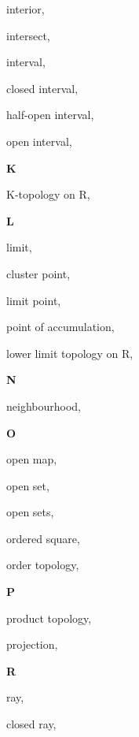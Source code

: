 \begin{multicols}{2}
interior, \pageref{def:Interior}

intersect, \pageref{def:Intersect}

interval, \pageref{def:Interval}

\hspace{2em}closed interval, \pageref{def:Interval}

\hspace{2em}half-open interval, \pageref{def:Interval}

\hspace{2em}open interval, \pageref{def:Interval}

\vspace{1em}\large{\textbf{K}}

K-topology on R, \pageref{def:KTopologyOnTheRealLine}

\vspace{1em}\large{\textbf{L}}

limit, \pageref{def:Limit}

cluster point, \pageref{def:LimitPoint}

limit point, \pageref{def:LimitPoint}

point of accumulation, \pageref{def:LimitPoint}

lower limit topology on R, \pageref{def:LowerLimitTopologyOnTheRealLine}

\vspace{1em}\large{\textbf{N}}

neighbourhood, \pageref{def:Neighbourhood}

\vspace{1em}\large{\textbf{O}}

open map, \pageref{def:OpenMap}

open set, \pageref{def:OpenSet}

open sets, \pageref{def:OpenSets}

ordered square, \pageref{def:OrderedSquare}

order topology, \pageref{def:OrderTopology}

\vspace{1em}\large{\textbf{P}}

product topology, \pageref{def:ProductTopology}

projection, \pageref{def:Projection}

\vspace{1em}\large{\textbf{R}}

ray, \pageref{def:Ray}

\hspace{2em}closed ray, \pageref{def:Ray}


\end{multicols}

